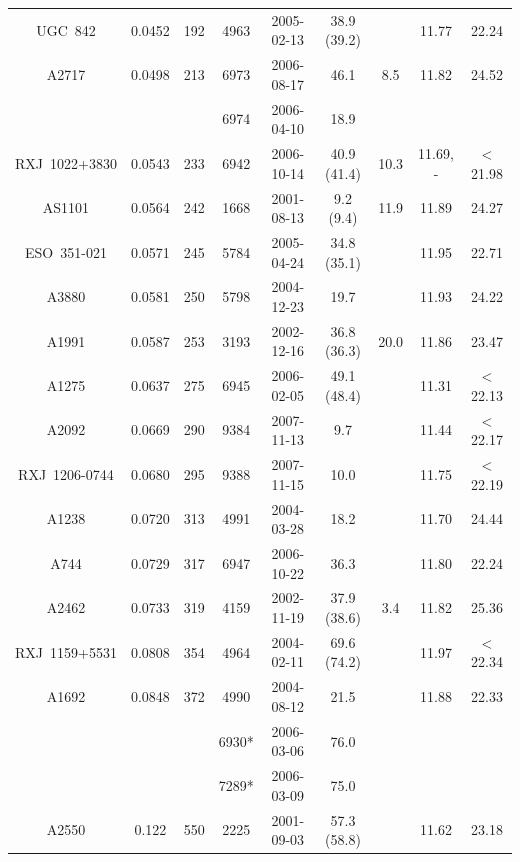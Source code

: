 \documentclass{aastex}
\begin{document}
\begin{table}
\begin{center}
{\begin{tabular}{ccccccccc}
UGC~842 & 0.0452 & 192 & 4963 & 2005-02-13 & 38.9 (39.2) & & 11.77 & 22.24 \\
A2717   & 0.0498 & 213 & 6973 & 2006-08-17 & 46.1 & 8.5 & 11.82 & 24.52 \\ 
        &        &     & 6974 & 2006-04-10 & 18.9 & & & \\
RXJ~1022+3830 & 0.0543 & 233 & 6942 & 2006-10-14 & 40.9 (41.4) & 10.3 & 11.69, - & $<$21.98 \\
AS1101 & 0.0564 & 242 & 1668 & 2001-08-13 & 9.2 (9.4) & 11.9 & 11.89 & 24.27 \\
ESO~351-021 & 0.0571 & 245 & 5784 & 2005-04-24 & 34.8 (35.1) & & 11.95 & 22.71 \\
A3880 & 0.0581 & 250 & 5798 & 2004-12-23 & 19.7 & & 11.93 & 24.22 \\
A1991 & 0.0587 & 253 & 3193 & 2002-12-16 & 36.8 (36.3) & 20.0 & 11.86 & 23.47 \\
A1275 & 0.0637 & 275 & 6945 & 2006-02-05 & 49.1 (48.4) & & 11.31 & $<$22.13 \\
A2092 & 0.0669 & 290 & 9384 & 2007-11-13 & 9.7 & & 11.44 & $<$22.17 \\
RXJ~1206-0744 & 0.0680 & 295 & 9388 & 2007-11-15 & 10.0 & & 11.75 & $<$22.19 \\
A1238 & 0.0720 & 313 & 4991 & 2004-03-28 & 18.2 & & 11.70 & 24.44 \\
A744  & 0.0729 & 317 & 6947 & 2006-10-22 & 36.3 & & 11.80 & 22.24 \\
A2462 & 0.0733 & 319 & 4159 & 2002-11-19 & 37.9 (38.6) & 3.4 & 11.82 & 25.36 \\
RXJ~1159+5531 & 0.0808 & 354 & 4964 & 2004-02-11 & 69.6 (74.2) & & 11.97 & $<$22.34 \\
A1692 & 0.0848 & 372 & 4990 & 2004-08-12 & 21.5 & & 11.88 & 22.33 \\
      &        &     & 6930* & 2006-03-06 & 76.0 &   &    &       \\
      &        &     & 7289* & 2006-03-09 & 75.0 &   &    &       \\
A2550 & 0.122  & 550 & 2225 & 2001-09-03 & 57.3 (58.8) & & 11.62 & 23.18 \\


\end{tabular}}
\end{center}
\end{table}
\end{document}
